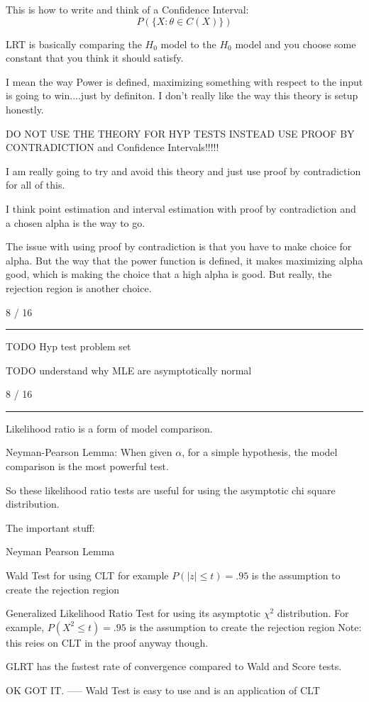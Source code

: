 \documentclass[12pt, reqno]{amsart}
\numberwithin{equation}{section}
\begin{document}
This is how to write and think of a Confidence Interval:
\[
P(\{ X : \theta \in C(X) \})
\]


LRT is basically comparing the $H_0$ model to the $H_0$ model and you choose some constant that you think it should satisfy.

I mean the way Power is defined, maximizing something with respect to the input is going to win....just by definiton.
I don't really like the way this theory is setup honestly.

DO NOT USE THE THEORY FOR HYP TESTS INSTEAD USE PROOF BY CONTRADICTION and Confidence Intervals!!!!!

I am really going to try and avoid this theory and just use proof by contradiction for all of this.

I think point estimation and interval estimation with proof by contradiction and a chosen alpha is the way to go.

The issue with using proof by contradiction is that you have to make  choice for alpha. But the way that the power function is defined, it makes maximizing alpha good, which is making the choice that a high alpha is good. But really, the rejection region is another choice.

8 / 16
\rule{\textwidth}{.5pt}

TODO Hyp test problem set

TODO understand why MLE are asymptotically normal


8 / 16
\rule{\textwidth}{.5pt}

Likelihood ratio is a form of model comparison.

Neyman-Pearson Lemma:
When given $\alpha$, for a simple hypothesis, the model comparison is the most powerful test.

So these likelihood ratio tests are useful for using the asymptotic chi square distribution.

The important stuff:

Neyman Pearson Lemma

Wald Test for using CLT for example $P(|z| \le t) = .95$ is the assumption to create the rejection region

Generalized Likelihood Ratio Test for using its asymptotic $\chi^2$ distribution. For example, $P(X^2 \le t) = .95$ is the assumption to create the rejection region
Note: this reies on CLT in the proof anyway though.

GLRT has the fastest rate of convergence compared to Wald and Score tests.

OK GOT IT.
-----
Wald Test is easy to use and is an application of CLT
\end{document}
